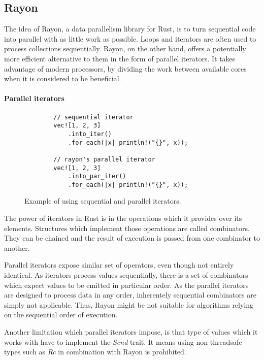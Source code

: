 \subsection{Rayon}
The idea of Rayon, a data parallelism library for Rust, is to turn sequential code into parallel with as little work as possible. Loops and iterators are often used to process collections sequentially. Rayon, on the other hand, offers a potentially more efficient alternative to them in the form of parallel iterators. It takes advantage of modern processors, by dividing the work between available cores when it is considered to be beneficial. 

\paragraph*{Parallel iterators}

\begin{figure}[!htbp] 
    \centering

    \begin{verbatim}
        // sequential iterator
        vec![1, 2, 3]
            .into_iter()
            .for_each(|x| println!("{}", x));

        // rayon's parallel iterator
        vec![1, 2, 3]
            .into_par_iter()
            .for_each(|x| println!("{}", x));
    \end{verbatim}

    \caption{Example of using sequential and parallel iterators.}
    \label{fig:par-iter-example}
\end{figure}

The power of iterators in Rust is in the operations which it provides over its elements. Structures which implement those operations are called combinators. They can be chained and the result of execution is passed from one combinator to another. 

Parallel iterators expose similar set of operators, even though not entirely identical. As iterators process values sequentially, there is a set of combinators which expect values to be emitted in particular order. As the parallel iterators are designed to process data in any order, inherentely sequential combinators are simply not applicable. Thus, Rayon might be not suitable for algorithms relying on the sequential order of execution.

Another limitation which parallel iterators impose, is that type of values which it works with have to implement the \emph{Send} trait. It means using non-threadsafe types such as \emph{Rc} in combination with Rayon is prohibited. 

